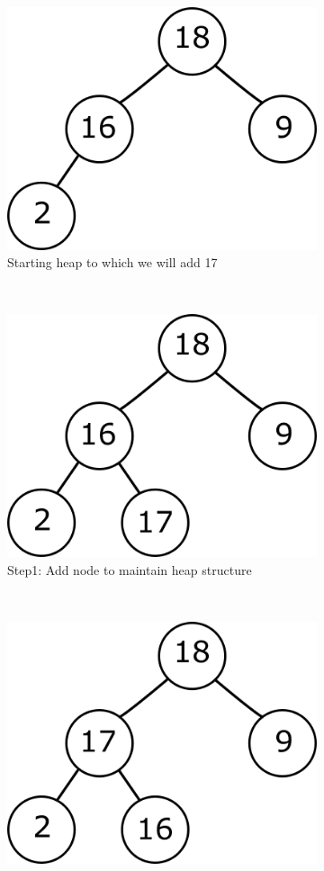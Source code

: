 \begin{figure}[h]
    \centering
    \begin{subfigure}[b]{0.3\textwidth}
        \includegraphics[scale = 0.3]{Images/insertion_step0.png}
        \caption{Starting heap to which we will add 17}
        \label{fig:insert_step0}
    \end{subfigure}
    ~
    \begin{subfigure}[b]{0.3\textwidth}
        \includegraphics[scale=0.3]{Images/insertion_step1.png}
        \caption{Step1: Add node to maintain heap structure}
        \label{fig:insert_step1}
    \end{subfigure}
    ~
    \begin{subfigure}[b]{0.3\textwidth}
        \includegraphics[scale=0.3]{Images/insertion_step2.png}

\end{subfigure}
\end{figure}
